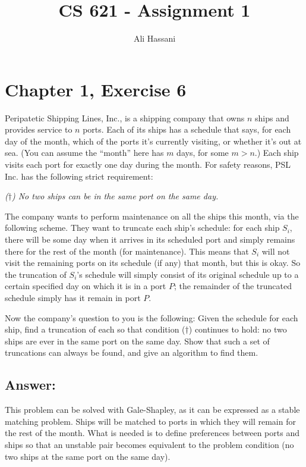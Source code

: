 \documentclass[12pt, letterpaper]{article}
\title{CS 621 - Assignment 1}
\author{Ali Hassani}
\begin{document}
\maketitle

\section{Chapter 1, Exercise 6}

Peripatetic Shipping Lines, Inc., is a shipping company that owns $n$ ships and provides service to $n$ ports. Each of its ships has a schedule that says, for each day of the month, which of the ports it's currently visiting, or whether it's out at sea. (You can assume the “month” here has $m$ days, for some $m > n$.) Each ship visits each port for exactly one day during the month. For safety reasons, PSL Inc. has the following strict requirement:

\vspace{2mm}
\textit{($\dagger$) No two ships can be in the same port on the same day.}
\vspace{2mm}

\noindent The company wants to perform maintenance on all the ships this month, via the following scheme. They want to truncate each ship's schedule: for each ship $S_i$, there will be some day when it arrives in its scheduled port and simply remains there for the rest of the month (for maintenance). This means that $S_i$ will not visit the remaining ports on its schedule (if any) that month, but this is okay. So the truncation of $S_i$'s schedule will simply consist of its original schedule up to a certain specified day on which it is in a port $P$; the remainder of the truncated schedule simply has it remain in port $P$.

Now the company's question to you is the following: Given the schedule for each ship, find a truncation of each so that condition ($\dagger$) continues to hold: no two ships are ever in the same port on the same day.
Show that such a set of truncations can always be found, and give an algorithm to find them.

\clearpage
\subsection*{Answer:}
This problem can be solved with Gale-Shapley, as it can be expressed as a stable matching problem.
Ships will be matched to ports in which they will remain for the rest of the month.
What is needed is to define preferences between ports and ships so that an unstable pair becomes equivalent to the problem condition (no two ships at the same port on the same day).
\end{document}
